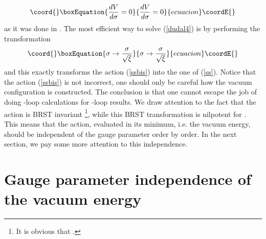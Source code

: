 \documentclass[a4paper,12pt]{article}
\providecommand{\sect}[1]{ \section{#1} \setcounter{equation}{0} }
\begin{document}
\begin{equation}\coord{}\boxEquation{  \label{dudal5}
\frac{dV}{d \sigma}=0
}{  \frac{dV}{d \sigma}=0
}{ecuacion}\coordE{}\end{equation}
as it was done in \cite{Lemes:2002rc}. The most efficient way to
solve (\ref {dudal4}) is by performing the transformation
\begin{equation}\coord{}\boxEquation{  \label{dudal6}
\sigma\rightarrow\frac{\sigma}{\sqrt{\xi}}
}{  \sigma\rightarrow\frac{\sigma}{\sqrt{\xi}}
}{ecuacion}\coordE{}\end{equation}
and this exactly transforms the action (\ref{ssbis}) into the one
of (\ref {ss}). Notice that the action (\ref{ssbis}) is not
incorrect, one should only be careful how the vacuum configuration
is constructed. The conclusion is that one cannot escape the job
of doing \coordHE{}-loop calculations for \coordHE{}-loop results. \newline
\newline
We draw attention to the fact that the action \coordHE{} is BRST invariant%
\footnote{%
It is obvious that \coordHE{}.}, while this BRST
transformation is nilpotent for \coordHE{}. This means that the action,
evaluated in its minimum, i.e. the vacuum energy, should be
independent of the gauge parameter \myHighlight{$\alpha$}\coordHE{} order by order. In the
next section, we pay some more attention to this \myHighlight{$\alpha$}\coordHE{}
independence.

\sect{Gauge parameter independence of the vacuum energy}
\end{document}
